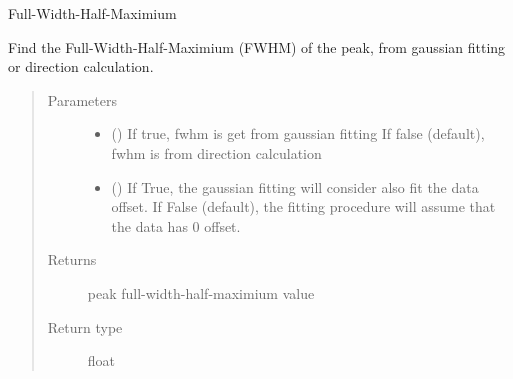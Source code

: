 \documentclass[letterpaper,10pt,english]{sphinxmanual}
\begin{document}
\begin{fulllineitems}

\begin{fulllineitems}
\label{\detokenize{scibeam.core:scibeam.core.peak.SeriesPeak.area}}
\end{fulllineitems}


\begin{fulllineitems}
\label{\detokenize{scibeam.core:scibeam.core.peak.SeriesPeak.autocrop}}
\end{fulllineitems}


\begin{fulllineitems}
\label{\detokenize{scibeam.core:scibeam.core.peak.SeriesPeak.fwhm}}
Full-Width-Half-Maximium

Find the Full-Width-Half-Maximium (FWHM) of the peak, from
gaussian fitting or direction calculation.
\begin{quote}\begin{description}
\item[{Parameters}] \leavevmode\begin{itemize}
\item {} 
 () \textendash{} If true, fwhm is get from gaussian fitting
If false (default), fwhm is from direction calculation

\item {} 
 () \textendash{} If True, the gaussian fitting will consider also fit the data
offset. If False (default), the fitting procedure will assume that
the data has 0 offset.

\end{itemize}

\item[{Returns}] \leavevmode
peak full-width-half-maximium value

\item[{Return type}] \leavevmode
float


\end{description}
\end{quote}
\end{fulllineitems}
\end{fulllineitems}
\end{document}
